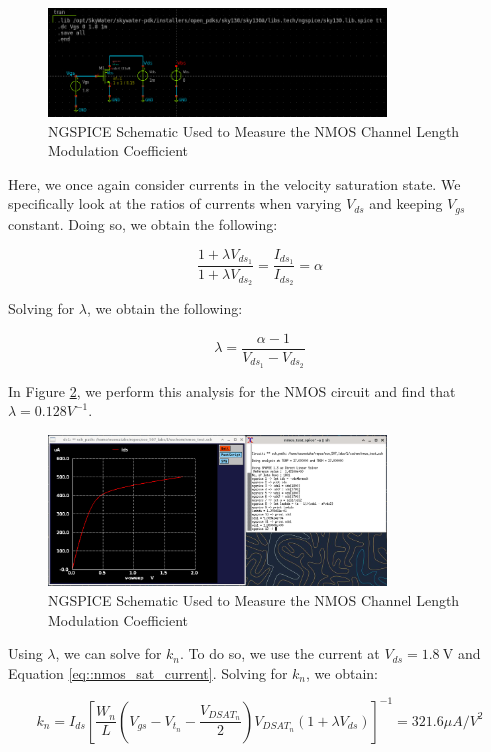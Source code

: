 \documentclass[fleqn]{article}
\begin{document}
	\begin{figure}[H]
		\centerline{\includegraphics[width=0.8\textwidth]{nmos_vt_meas_schem.png}}
		\caption{NGSPICE Schematic Used to Measure the NMOS Channel Length Modulation Coefficient}
		\label{fig::nmos_lambda_meas_schem}
	\end{figure}
	
	\noindent Here, we once again consider currents in the velocity saturation state. We specifically look at the ratios of currents when varying $V_{ds}$ and keeping $V_{gs}$ constant. Doing so, we obtain the following:
	
	\begin{equation}
		\frac{1 + {\lambda}V_{ds_1}}{1 + {\lambda}V_{ds_2}} = \frac{I_{ds_1}}{I_{ds_2}} = \alpha
	\end{equation}
	
	\noindent Solving for $\lambda$, we obtain the following:
	
	\begin{equation}
		\lambda = \frac{\alpha - 1}{V_{ds_1} - V_{ds_2}}
	\end{equation}
	
	\noindent In Figure \ref{fig::nmos_lambda_meas}, we perform this analysis for the NMOS circuit and find that $\lambda = 0.128 V^{-1}$.
	
	\begin{figure}[H]
		\centerline{\includegraphics[width=0.8\textwidth]{nmos_lambda_meas.png}}
		\caption{NGSPICE Schematic Used to Measure the NMOS Channel Length Modulation Coefficient}
		\label{fig::nmos_lambda_meas}
	\end{figure}
	
	\noindent Using $\lambda$, we can solve for $k_n$. To do so, we use the current at $V_{ds}=1.8\ \text{V}$ and Equation \ref{eq::nmos_sat_current}. Solving for $k_n$, we obtain:
	
	\begin{equation}
		k_n = I_{ds}\left[\frac{W_n}{L}\left(V_{gs} - V_{t_n} - \frac{V_{DSAT_n}}{2}\right)V_{DSAT_n}(1 + {\lambda}V_{ds})\right]^{-1} = 321.6 {\mu}A/V^2
	\end{equation}
	
	 
\end{document}
